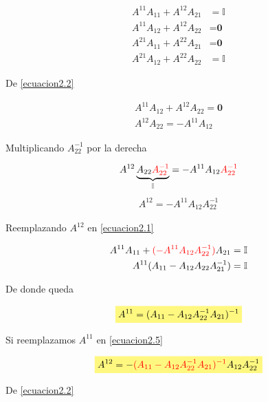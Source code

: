 \documentclass[12pt]{article}
\newcommand{\highlight}[2][yellow]{\mathchoice%
  {\colorbox{#1}{$\displaystyle#2$}}%
  {\colorbox{#1}{$\textstyle#2$}}%
  {\colorbox{#1}{$\scriptstyle#2$}}%
  {\colorbox{#1}{$\scriptscriptstyle#2$}}}%
\begin{document}
\begin{align}
    A^{11}A_{11} + A^{12}A_{21} &= \mathbb{I} \label{ecuacion2.1} \\ 
    A^{11}A_{12} + A^{12}A_{22} &= \textbf{0} \label{ecuacion2.2} \\ 
    A^{21}A_{11} + A^{22}A_{21} &= \textbf{0} \label{ecuacion2.3} \\ 
    A^{21}A_{12} + A^{22}A_{22} &= \mathbb{I} \label{ecuacion2.4}
\end{align}

De \eqref{ecuacion2.2}

\begin{align*}
    A^{11}A_{12} + A^{12}A_{22} = \textbf{0} \\
    A^{12}A_{22} = -A^{11}A_{12}
\end{align*}

Multiplicando \color{red} $A_{22}^{-1}$ \color{black} por la derecha

\begin{align*}
    A^{12}\underbrace{A_{22}\color{red} A_{22}^{-1} \color{black}}_{\mathbb{I}} = -A^{11}A_{12} \color{red} A_{22}^{-1} \color{black}
\end{align*}
\begin{align} \label{ecuacion2.5}
    A^{12} = -A^{11}A_{12} A_{22}^{-1}
\end{align}

Reemplazando \color{red} $A^{12}$ \color{black} en \eqref{ecuacion2.1}

\begin{align*}
    A^{11}A_{11} + \color{red}(-A^{11}A_{12} A_{22}^{-1})\color{black} A_{21} = \mathbb{I} \\
    A^{11}(A_{11} - A_{12}A_{22}A_{21}^{-1}) = \mathbb{I}
\end{align*}

De donde queda 

\begin{equation}\label{ecuacion2.6}
    \highlight[yellow!50!white]{ A^{11} = (A_{11} - A_{12}A_{22}^{-1}A_{21})^{-1} }
\end{equation}

Si reemplazamos \color{red} $A^{11}$ \color{black} en \eqref{ecuacion2.5}

\begin{align*} 
    \highlight[yellow!50!white]{ A^{12} = -\color{red} (A_{11} - A_{12}A_{22}^{-1}A_{21})^{-1} \color{black}A_{12} A_{22}^{-1}}
\end{align*}

De \eqref{ecuacion2.2} 
\end{document}
